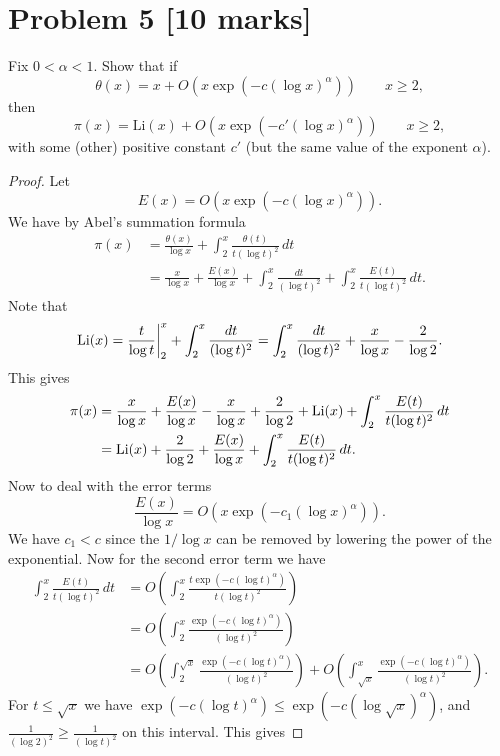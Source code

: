 \documentclass[12pt]{article}
\begin{document}
\section*{Problem 5 [10 marks]} 
Fix $0<\alpha<1$. Show that if 
\[
    \theta(x)=x+O\left(x\exp(-c(\log x)^\alpha)\right)\quad\quad x\geq2,
\]
then 
\[
    \pi(x)=\mathrm{Li}(x)+O\left(x\exp(-c'(\log x)^\alpha)\right)\quad\quad x\geq2,
\]
with some (other) positive constant $c'$ (but the same value of the exponent $\alpha$).
\begin{proof}
    Let 
    \[
        E(x)=O\left(x\exp(-c(\log x)^\alpha)\right).
    \]
    We have by Abel's summation formula
    \begin{align*}
        \pi(x)&=\frac{\theta(x)}{\log x}+\int_{2}^{x}\frac{\theta(t)}{t(\log t)^2}\,dt\\
        &=\frac{x}{\log x}+\frac{E(x)}{\log x}+\int_{2}^{x}\frac{dt}{(\log t)^2}+\int_{2}^{x}\frac{E(t)}{t(\log t)^2}\,dt.
    \end{align*}
    Note that
    \[
        \operatorname{Li}(x)=\frac{t}{\log t}\bigg\rvert_2^x+\int_{2}^{x}\frac{dt}{(\log t)^2}=\int_{2}^{x}\frac{dt}{(\log t)^2}+\frac{x}{\log x}-\frac{2}{\log 2}.
    \]
    This gives
    \begin{align*}
        \pi(x)&=\frac{x}{\log x}+\frac{E(x)}{\log x}-\frac{x}{\log x}+\frac{2}{\log2}+\operatorname{Li}(x)+\int_{2}^{x}\frac{E(t)}{t(\log t)^2}\,dt\\
        &=\operatorname{Li}(x)+\frac{2}{\log2}+\frac{E(x)}{\log x}+\int_{2}^{x}\frac{E(t)}{t(\log t)^2}\,dt.
    \end{align*}
    Now to deal with the error terms
    \[
        \frac{E(x)}{\log x}=O\left(x\exp(-c_1(\log x)^\alpha)\right).
    \]
    We have $c_1< c$ since the $1/\log x$ can be removed by lowering the power of the exponential. Now for the second error term we have
    \begin{align*}
        \int_{2}^{x}\frac{E(t)}{t(\log t)^2}\,dt&=O\left(\int_{2}^{x}\frac{t\exp(-c(\log t)^\alpha)}{t(\log t)^2}\right)\\
        &=O\left(\int_{2}^{x}\frac{\exp(-c(\log t)^\alpha)}{(\log t)^2}\right)\\
        &=O\left(\int_{2}^{\sqrt{x}}\frac{\exp(-c(\log t)^\alpha)}{(\log t)^2}\right)+O\left(\int_{\sqrt{x}}^{x}\frac{\exp(-c(\log t)^\alpha)}{(\log t)^2}\right).
    \end{align*}
    For $t\leq\sqrt{x}$ we have $\exp(-c(\log t)^\alpha)\leq\exp(-c(\log \sqrt{x})^\alpha)$, and $\frac{1}{(\log 2)^2}\geq\frac{1}{(\log t)^2}$ on this interval. This gives

\end{proof}
\end{document}
